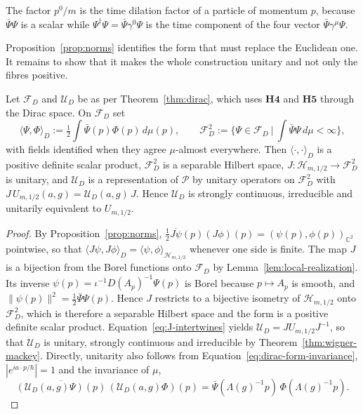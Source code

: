\noindent The factor $p^0/m$ is the time dilation factor of a particle of momentum $p$, because $\bar{\Psi}\Psi$ is a scalar while $\Psi^\dagger\Psi=\bar{\Psi}\gamma^0\Psi$ is the time component of the four vector $\bar{\Psi}\gamma^\mu\Psi$.

Proposition~\ref{prop:norms} identifies the form that must replace the Euclidean one. It remains to show that it makes the whole construction unitary and not only the fibres positive.

\begin{theorem}\label{thm:covariant-norm}
	Let $\mathcal{F}_D$ and $\mathcal{U}_D$ be as per Theorem~\ref{thm:dirac}, which uses $\mathbf{H4}$ and $\mathbf{H5}$ through the Dirac space. On $\mathcal{F}_D$ set
	\begin{equation*}
		\langle\Psi,\Phi\rangle_D:=\tfrac12\int\bar{\Psi}(p)\Phi(p)\,d\mu(p),\qquad \mathcal{F}_D^2:=\Big\{\Psi\in\mathcal{F}_D\ \Big|\ \int\bar{\Psi}\Psi\,d\mu<\infty\Big\},
	\end{equation*}
	with fields identified when they agree $\mu$-almost everywhere. Then $\langle\cdot,\cdot\rangle_D$ is a positive definite scalar product, $\mathcal{F}_D^2$ is a separable Hilbert space, $J:\mathcal{H}_{m,1/2}\to\mathcal{F}_D^2$ is unitary, and $\mathcal{U}_D$ is a representation of $\mathcal{P}$ by unitary operators on $\mathcal{F}_D^2$ with $J\,U_{m,1/2}(a,g)=\mathcal{U}_D(a,g)\,J$. Hence $\mathcal{U}_D$ is strongly continuous, irreducible and unitarily equivalent to $U_{m,1/2}$.
\end{theorem}

\begin{proof}
	By Proposition~\ref{prop:norms}, $\tfrac12\overline{J\psi}(p)(J\phi)(p)=(\psi(p),\phi(p))_{\mathbb{C}^2}$ pointwise, so that $\langle J\psi,J\phi\rangle_D=\langle\psi,\phi\rangle_{\mathcal{H}_{m,1/2}}$ whenever one side is finite. The map $J$ is a bijection from the Borel functions onto $\mathcal{F}_D$ by Lemma~\ref{lem:local-realization}. Its inverse $\psi(p)=\iota^{-1}D(A_p)^{-1}\Psi(p)$ is Borel because $p\mapsto A_p$ is smooth, and $\|\psi(p)\|^2=\tfrac12\bar{\Psi}\Psi(p)$. Hence $J$ restricts to a bijective isometry of $\mathcal{H}_{m,1/2}$ onto $\mathcal{F}_D^2$, which is therefore a separable Hilbert space and the form is a positive definite scalar product. Equation~\eqref{eq:J-intertwines} yields $\mathcal{U}_D=JU_{m,1/2}J^{-1}$, so that $\mathcal{U}_D$ is unitary, strongly continuous and irreducible by Theorem~\ref{thm:wigner-mackey}. Directly, unitarity also follows from Equation~\eqref{eq:dirac-form-invariance}, $|e^{ia\cdot p/\hbar}|=1$ and the invariance of $\mu$,
	\begin{equation*}
		\overline{(\mathcal{U}_D(a,g)\Psi)(p)}\,(\mathcal{U}_D(a,g)\Phi)(p)=\bar{\Psi}(\Lambda(g)^{-1}p)\,\Phi(\Lambda(g)^{-1}p).
	\end{equation*}
\end{proof}

